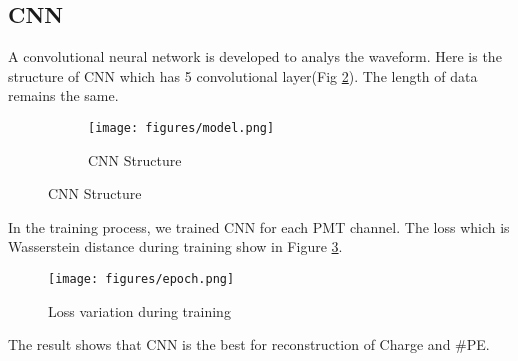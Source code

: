 \subsection{CNN}
A convolutional neural network is developed to analys the waveform. Here is the structure of CNN which has 5 convolutional layer(Fig \ref{fig:struct}). The length of data remains the same. 

\begin{figure}[H]
\begin{minipage}{.3\textwidth}
\begin{figure}[H]
    \centering
    \caption{CNN Structure}
    \texttt{[image: figures/model.png]}
    \label{fig:struct}
\end{figure}
\end{minipage}
\hspace{4mm}
\begin{minipage}{.7\textwidth}

\end{minipage}
\end{figure}

In the training process, we trained CNN for each PMT channel. The loss which is Wasserstein distance during training show in Figure \ref{fig:loss}. 

\begin{figure}[H]
    \centering
    \caption{Loss variation during training}
    \texttt{[image: figures/epoch.png]}
    \label{fig:loss}
\end{figure}

The result shows that CNN is the best for reconstruction of Charge and \#PE. 

